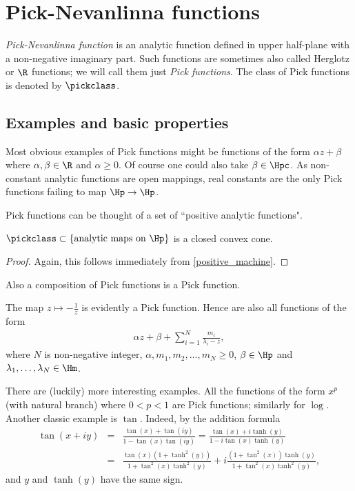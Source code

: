 \chapter{Pick-Nevanlinna functions}

\textit{Pick-Nevanlinna function} is an analytic function defined in upper half-plane with a non-negative imaginary part. Such functions are sometimes also called Herglotz or $\R$ functions; we will call them just \textit{Pick functions}. The class of Pick functions is denoted by $\pickclass$.

\section{Examples and basic properties}

Most obvious examples of Pick functions might be functions of the form $\alpha z + \beta$ where $\alpha, \beta \in \R$ and $\alpha \geq 0$. Of course one could also take $\beta \in \Hpc$. As non-constant analytic functions are open mappings, real constants are the only Pick functions failing to map $\Hp \to \Hp$.

Pick functions can be thought of a set of ``positive analytic functions".

\begin{lause}
	$\pickclass \subset \{\text{analytic maps on $\Hp$} \}$ is a closed convex cone.
\end{lause}
\begin{proof}
	Again, this follows immediately from \ref{positive_machine}.
\end{proof}

Also a composition of Pick functions is a Pick function.

The map $z \mapsto -\frac{1}{z}$ is evidently a Pick function. Hence are also all functions of the form
\begin{align*}
	\alpha z + \beta + \sum_{i = 1}^{N} \frac{m_{i}}{\lambda_{i}- z},
\end{align*}
where $N$ is non-negative integer, $\alpha, m_{1}, m_{2}, \ldots, m_{N} \geq 0$, $\beta \in \Hp$ and $\lambda_{1}, \ldots, \lambda_{N} \in \Hm$.

There are (luckily) more interesting examples. All the functions of the form $x^{p}$ (with natural branch) where $0 < p < 1$ are Pick functions; similarly for $\log$. Another classic example is $\tan$. Indeed, by the addition formula
\begin{eqnarray*}
	\tan(x + i y) &=& \frac{\tan(x) + \tan(i y)}{1 - \tan(x) \tan(i y)} = \frac{\tan(x) + i \tanh(y)}{1 - i \tan(x) \tanh(y)} \\
	&=& \frac{\tan(x)(1 + \tanh^2(y))}{1 + \tan^2(x) \tanh^2(y)} + i \frac{(1 + \tan^2(x))\tanh(y)}{1 + \tan^2(x) \tanh^2(y)},
\end{eqnarray*}
and $y$ and $\tanh(y)$ have the same sign.

